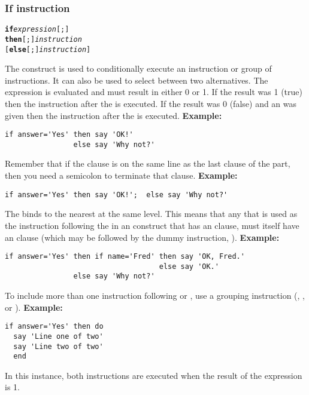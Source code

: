 \subsubsection{If instruction}
\index{,}
\begin{shaded}
\begin{alltt}
\textbf{if} \emph{expression}[;]
     \textbf{then}[;] \emph{instruction}
    [\textbf{else}[;] \emph{instruction}]
\end{alltt}
\end{shaded}
 The  construct is used to conditionally execute an
instruction or group of instructions.
It can also be used to select between two alternatives.
 The expression is evaluated and must result in either 0 or 1.
If the result was 1 (true) then the instruction after the
 is executed.
If the result was 0 (false) and an  was given
then the instruction after the  is executed.
 \textbf{Example:}
\begin{lstlisting}
if answer='Yes' then say 'OK!'
                else say 'Why not?'
\end{lstlisting}
 Remember that if the  clause is on the same line as the
last clause of the  part, then you need a semicolon to
terminate that clause.
 \textbf{Example:}
\begin{lstlisting}
if answer='Yes' then say 'OK!';  else say 'Why not?'
\end{lstlisting}
 The  binds to the nearest  at the same level.
This means that any  that is used as the instruction
following the  in an  construct that has an
 clause, must itself have an  clause (which
may be followed by the dummy instruction, ).
 \textbf{Example:}
\begin{lstlisting}
if answer='Yes' then if name='Fred' then say 'OK, Fred.'
                                    else say 'OK.'
                else say 'Why not?'
\end{lstlisting}
 
To include more than one instruction following  or
, use a grouping instruction (, ,
or ).
 \textbf{Example:}
\begin{lstlisting}
if answer='Yes' then do
  say 'Line one of two'
  say 'Line two of two'
  end
\end{lstlisting}
In this instance, both  instructions are executed when
the result of the  expression is 1.
 
